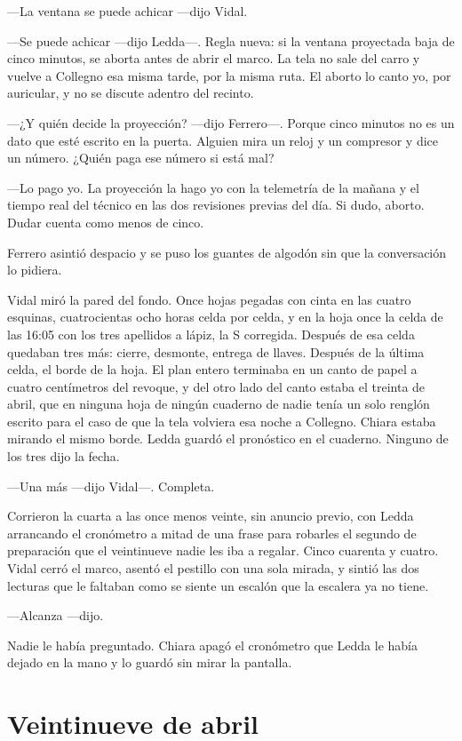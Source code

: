 ---La ventana se puede achicar ---dijo Vidal.

---Se puede achicar ---dijo Ledda---. Regla nueva: si la ventana proyectada baja de cinco minutos, se aborta antes de abrir el marco. La tela no sale del carro y vuelve a Collegno esa misma tarde, por la misma ruta. El aborto lo canto yo, por auricular, y no se discute adentro del recinto.

---¿Y quién decide la proyección? ---dijo Ferrero---. Porque cinco minutos no es un dato que esté escrito en la puerta. Alguien mira un reloj y un compresor y dice un número. ¿Quién paga ese número si está mal?

---Lo pago yo. La proyección la hago yo con la telemetría de la mañana y el tiempo real del técnico en las dos revisiones previas del día. Si dudo, aborto. Dudar cuenta como menos de cinco.

Ferrero asintió despacio y se puso los guantes de algodón sin que la conversación lo pidiera.

Vidal miró la pared del fondo. Once hojas pegadas con cinta en las cuatro esquinas, cuatrocientas ocho horas celda por celda, y en la hoja once la celda de las 16:05 con los tres apellidos a lápiz, la S corregida. Después de esa celda quedaban tres más: cierre, desmonte, entrega de llaves. Después de la última celda, el borde de la hoja. El plan entero terminaba en un canto de papel a cuatro centímetros del revoque, y del otro lado del canto estaba el treinta de abril, que en ninguna hoja de ningún cuaderno de nadie tenía un solo renglón escrito para el caso de que la tela volviera esa noche a Collegno. Chiara estaba mirando el mismo borde. Ledda guardó el pronóstico en el cuaderno. Ninguno de los tres dijo la fecha.

---Una más ---dijo Vidal---. Completa.

Corrieron la cuarta a las once menos veinte, sin anuncio previo, con Ledda arrancando el cronómetro a mitad de una frase para robarles el segundo de preparación que el veintinueve nadie les iba a regalar. Cinco cuarenta y cuatro. Vidal cerró el marco, asentó el pestillo con una sola mirada, y sintió las dos lecturas que le faltaban como se siente un escalón que la escalera ya no tiene.

---Alcanza ---dijo.

Nadie le había preguntado. Chiara apagó el cronómetro que Ledda le había dejado en la mano y lo guardó sin mirar la pantalla.

\clearpage

\chapter{Veintinueve de abril}

